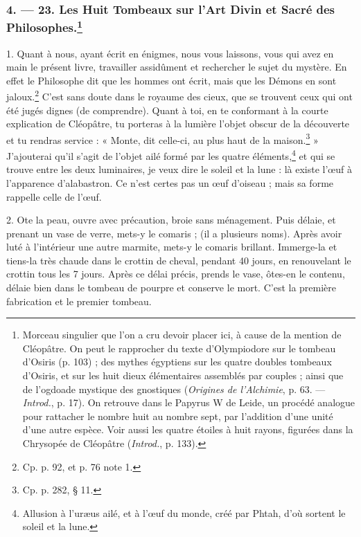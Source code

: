 \documentclass[a4paper, 11pt, oneside, polutonikogreek, french]{article}
\begin{document}
\subsubsection[4. --- 23. Les Huit Tombeaux sur l'Art Divin et Sacré des Philosophes.]{4. --- 23. Les Huit Tombeaux sur l'Art Divin et Sacré des Philosophes.\footnote{Morceau singulier que l'on a cru devoir placer ici, à cause de la mention de Cléopâtre. On peut le rapprocher du texte d'Olympiodore sur le tombeau d'Osiris (p. 103) ; des mythes égyptiens sur les quatre doubles tombeaux d'Osiris, et sur les huit dieux élémentaires assemblés par couples ; ainsi que de l'ogdoade mystique des gnostiques (\emph{Origines de l'Alchimie}, p. 63. --- \emph{Introd.}, p. 17). On retrouve dans le Papyrus W de Leide, un procédé analogue pour rattacher le nombre huit au nombre sept, par l'addition d'une unité d'une autre espèce. Voir aussi les quatre étoiles à huit rayons, figurées dans la Chrysopée de Cléopâtre (\emph{Introd.}, p. 133).}}

1. Quant à nous, ayant écrit en énigmes, nous vous laissons, vous qui avez en main le présent livre, travailler assidûment et rechercher le sujet du mystère. En effet le Philosophe dit que les hommes ont écrit, mais que les Démons en sont jaloux.\footnote{Cp. p. 92, et p. 76 note 1.} C'est sans doute dans le royaume des cieux, que se trouvent ceux qui ont été jugés dignes (de comprendre). Quant à toi, en te conformant à la courte explication de Cléopâtre, tu porteras à la lumière l'objet obscur de la découverte et tu rendras service : « Monte, dit celle-ci, au plus haut de la maison.\footnote{Cp. p. 282, § 11.} » J'ajouterai qu'il s'agit de l'objet ailé formé par les quatre éléments,\footnote{Allusion à l'uræus ailé, et à l'œuf du monde, créé par Phtah, d'où sortent le soleil et la lune.} et qui se trouve entre les deux luminaires, je veux dire le soleil et la lune : là existe l'œuf à l'apparence d'alabastron. Ce n'est certes pas un œuf d'oiseau ; mais sa forme rappelle celle de l'œuf.

2. Ote la peau, ouvre avec précaution, broie sans ménagement. Puis délaie, et prenant un vase de verre, mets-y le comaris ; (il a plusieurs noms). Après avoir luté à l'intérieur une autre marmite, mets-y le comaris brillant. Immerge-la et tiens-la très chaude dans le crottin de cheval, pendant 40 jours, en renouvelant le crottin tous les 7 jours. Après ce délai précis, prends le vase, ôtes-en le contenu, délaie bien dans le tombeau de pourpre et conserve le mort. C'est la première fabrication et le premier tombeau.
\end{document}
